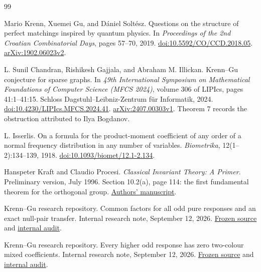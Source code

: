 \documentclass[11pt]{article}
\theoremstyle{definition}
\theoremstyle{plain}
\numberwithin{equation}{section}
\begin{document}
\begingroup
\small
\raggedright
\begin{thebibliography}{99}

Mario Krenn, Xuemei Gu, and D\'aniel Solt\'esz.
Questions on the structure of perfect matchings inspired by quantum physics.
In \emph{Proceedings of the 2nd Croatian Combinatorial Days}, pages 57--70, 2019.
\href{https://doi.org/10.5592/CO/CCD.2018.05}{doi:10.5592/CO/CCD.2018.05}.
\href{https://arxiv.org/abs/1902.06023v2}{arXiv:1902.06023v2}.

L. Sunil Chandran, Rishikesh Gajjala, and Abraham M. Illickan.
Krenn--Gu conjecture for sparse graphs.
In \emph{49th International Symposium on Mathematical Foundations of Computer
Science (MFCS 2024)}, volume 306 of LIPIcs, pages 41:1--41:15.
Schloss Dagstuhl--Leibniz-Zentrum f\"ur Informatik, 2024.
\href{https://doi.org/10.4230/LIPIcs.MFCS.2024.41}{doi:10.4230/LIPIcs.MFCS.2024.41}.
\href{https://arxiv.org/abs/2407.00303v1}{arXiv:2407.00303v1}.
Theorem 7 records the obstruction attributed to Ilya Bogdanov.

L. Isserlis.
On a formula for the product-moment coefficient of any order of a normal
frequency distribution in any number of variables.
\emph{Biometrika}, 12(1--2):134--139, 1918.
\href{https://doi.org/10.1093/biomet/12.1-2.134}{doi:10.1093/biomet/12.1-2.134}.

Hanspeter Kraft and Claudio Procesi.
\emph{Classical Invariant Theory: A Primer}.
Preliminary version, July 1996.
Section 10.2(a), page 114: the first fundamental theorem for the orthogonal group.
\href{https://dmi.unibas.ch/fileadmin/user_upload/dmi/Personen/Kraft_Hanspeter/Classical_Invariant_Theory.pdf}{Authors' manuscript}.

Krenn--Gu research repository.
Common factors for all odd pure responses and an exact null-pair transfer.
Internal research note, September 12, 2026.
\href{https://github.com/rrajasek95/krenn-conjecture/blob/e66211d22978927f1c761997472fa9f5cf8f9421/computations/unaudited-codex-higher-common-power-bridge-2026-09-05/UNIFORM-ALL-ODD-DIAGONAL-RESPONSE-FACTORS-AND-NULL-PAIR-TRANSFER.md}{Frozen source} and
\href{https://github.com/rrajasek95/krenn-conjecture/blob/e66211d22978927f1c761997472fa9f5cf8f9421/computations/unaudited-codex-higher-common-power-bridge-2026-09-05/UNIFORM-ALL-ODD-DIAGONAL-RESPONSE-FACTORS-AND-NULL-PAIR-TRANSFER-AUDIT.md}{internal audit}.

Krenn--Gu research repository.
Every higher odd response has zero two-colour mixed coefficients.
Internal research note, September 12, 2026.
\href{https://github.com/rrajasek95/krenn-conjecture/blob/e66211d22978927f1c761997472fa9f5cf8f9421/computations/unaudited-codex-higher-common-power-bridge-2026-09-05/UNIFORM-ALL-ODD-TWO-COLOR-MIXED-VANISHING-AND-KERNEL-PENCIL.md}{Frozen source} and
\href{https://github.com/rrajasek95/krenn-conjecture/blob/e66211d22978927f1c761997472fa9f5cf8f9421/computations/unaudited-codex-higher-common-power-bridge-2026-09-05/UNIFORM-ALL-ODD-TWO-COLOR-MIXED-VANISHING-AND-KERNEL-PENCIL-AUDIT.md}{internal audit}.


\end{thebibliography}
\end{document}
